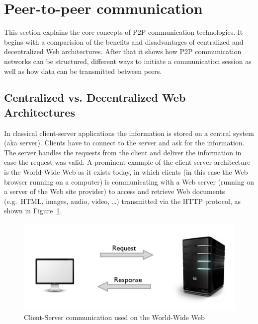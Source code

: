 
\section{Peer-to-peer communication}
\label{sec:p2p_communication}

This section explains the core concepts of \gls{P2P} communication technologies. It begins with a comparision of the benefits and disadvantages of centralized and decentralized Web architectures. After that it shows how \gls{P2P} communication networks can be structured, different ways to initiate a communication session as well as how data can be transmitted between peers.

\subsection{Centralized vs. Decentralized Web Architectures}
\label{sec:central_decentral_arch}

In classical client-server applications the information is stored on a central system (aka server). Clients have to connect to the server and ask for the information. The server handles the requests from the client and deliver the information in case the request was valid. A prominent example of the client-server architecture is the World-Wide Web as it exists today, in which clients (in this case the Web browser running on a computer) is communicating with a Web server (running on a server of the Web site provider) to access and retrieve Web documents (e.g.\ \gls{HTML}, images, audio, video, \ldots) transmitted via the \gls{HTTP} protocol, as shown in Figure~\ref{fig:p2p_central_server}. \@

\begin{figure}[H]
	\centering
		\includegraphics[width=0.9\columnwidth]{images/client-server-web.png}
	\caption[Client-Server communication used on the World-Wide Web]{Client-Server communication used on the World-Wide Web \citep{codeTuts}}
\label{fig:p2p_central_server}
\end{figure}

